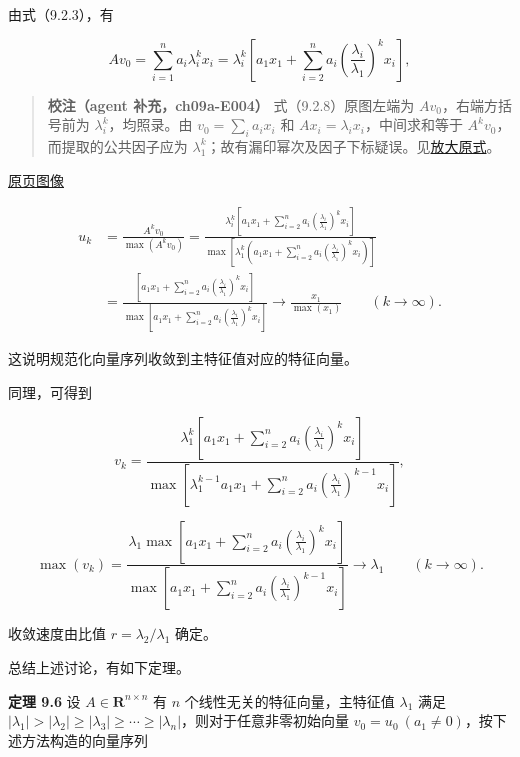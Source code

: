 \documentclass[
  10pt,
  fontset=fandol]{ctexart}
\begin{document}
由式（9.2.3），有

\[
Av_0=\sum_{i=1}^na_i\lambda_i^kx_i=\lambda_i^k\left[a_1x_1+\sum_{i=2}^na_i\left(\frac{\lambda_i}{\lambda_1}\right)^kx_i\right],
\tag{9.2.8}
\]

\begin{quote}
\textbf{校注（agent 补充，ch09a-E004）} 式（9.2.8）原图左端为 \(Av_0\)，右端方括号前为 \(\lambda_i^k\)，均照录。由 \(v_0=\sum_i a_ix_i\) 和 \(Ax_i=\lambda_ix_i\)，中间求和等于 \(A^kv_0\)，而提取的公共因子应为 \(\lambda_1^k\)；故有漏印幂次及因子下标疑误。见\href{../assets/ch09a/review-p236-9-2-8.png}{放大原式}。
\end{quote}

\href{../../source-images/pdf-237.jpeg}{原页图像}

\[
\begin{aligned}
u_k&=\frac{A^kv_0}{\max(A^kv_0)}
=\frac{\lambda_i^k\left[a_1x_1+\displaystyle\sum_{i=2}^na_i\left(\frac{\lambda_i}{\lambda_1}\right)^kx_i\right]}{\max\left[\lambda_1^k\left(a_1x_1+\displaystyle\sum_{i=2}^na_i\left(\frac{\lambda_i}{\lambda_1}\right)^kx_i\right)\right]}\\
&=\frac{\left[a_1x_1+\displaystyle\sum_{i=2}^na_i\left(\frac{\lambda_i}{\lambda_1}\right)^kx_i\right]}{\max\left[a_1x_1+\displaystyle\sum_{i=2}^na_i\left(\frac{\lambda_i}{\lambda_1}\right)^kx_i\right]}
\to\frac{x_1}{\max(x_1)}\qquad(k\to\infty).
\end{aligned}
\]

这说明规范化向量序列收敛到主特征值对应的特征向量。

同理，可得到

\[
v_k=\frac{\lambda_1^k\left[a_1x_1+\displaystyle\sum_{i=2}^na_i\left(\frac{\lambda_i}{\lambda_1}\right)^kx_i\right]}{\max\left[\lambda_1^{k-1}a_1x_1+\displaystyle\sum_{i=2}^na_i\left(\frac{\lambda_i}{\lambda_1}\right)^{k-1}x_i\right]},
\]

\[
\max(v_k)=\frac{\lambda_1\max\left[a_1x_1+\displaystyle\sum_{i=2}^na_i\left(\frac{\lambda_i}{\lambda_1}\right)^kx_i\right]}{\max\left[a_1x_1+\displaystyle\sum_{i=2}^na_i\left(\frac{\lambda_i}{\lambda_1}\right)^{k-1}x_i\right]}\to\lambda_1\qquad(k\to\infty).
\]

收敛速度由比值 \(r=\lambda_2/\lambda_1\) 确定。

总结上述讨论，有如下定理。

\textbf{定理 9.6} 设 \(A\in\mathbf R^{n\times n}\) 有 \(n\) 个线性无关的特征向量，主特征值 \(\lambda_1\) 满足 \(|\lambda_1|>|\lambda_2|\geq|\lambda_3|\geq\cdots\geq|\lambda_n|\)，则对于任意非零初始向量 \(v_0=u_0\ (a_1\ne0)\)，按下述方法构造的向量序列
\end{document}
